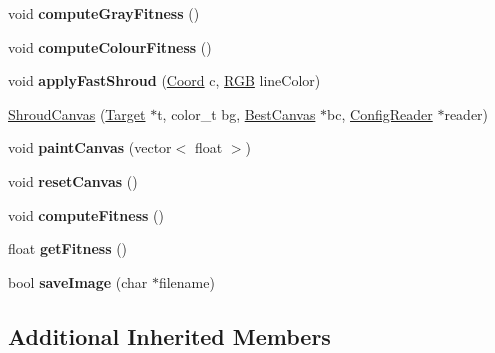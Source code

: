 \begin{DoxyCompactItemize}
\item 
\hypertarget{class_shroud_canvas_aafb22920622d9c722b46d89ac3763cd1}{void {\bfseries compute\-Gray\-Fitness} ()}\label{class_shroud_canvas_aafb22920622d9c722b46d89ac3763cd1}

\item 
\hypertarget{class_shroud_canvas_a4a52d39ad5baa0af0f75265e0c0199fe}{void {\bfseries compute\-Colour\-Fitness} ()}\label{class_shroud_canvas_a4a52d39ad5baa0af0f75265e0c0199fe}

\item 
\hypertarget{class_shroud_canvas_a91e19afb81445e373c0f66983d7d7bae}{void {\bfseries apply\-Fast\-Shroud} (\hyperlink{struct_coord}{Coord} c, \hyperlink{struct_r_g_b}{R\-G\-B} line\-Color)}\label{class_shroud_canvas_a91e19afb81445e373c0f66983d7d7bae}

\item 
\hyperlink{class_shroud_canvas_af61ed840d4483e18098eaadae9240282}{Shroud\-Canvas} (\hyperlink{class_target}{Target} $\ast$t, color\-\_\-t bg, \hyperlink{class_best_canvas}{Best\-Canvas} $\ast$bc, \hyperlink{class_config_reader}{Config\-Reader} $\ast$reader)
\item 
\hypertarget{class_shroud_canvas_ab0962bd430ae1fdc9e61b487e45a4fa1}{void {\bfseries paint\-Canvas} (vector$<$ float $>$)}\label{class_shroud_canvas_ab0962bd430ae1fdc9e61b487e45a4fa1}

\item 
\hypertarget{class_shroud_canvas_af90fc7e9d58b8089ffb5ba8ece8c15df}{void {\bfseries reset\-Canvas} ()}\label{class_shroud_canvas_af90fc7e9d58b8089ffb5ba8ece8c15df}

\item 
\hypertarget{class_shroud_canvas_aed1b210f02c2735df7459a992cdeb208}{void {\bfseries compute\-Fitness} ()}\label{class_shroud_canvas_aed1b210f02c2735df7459a992cdeb208}

\item 
\hypertarget{class_shroud_canvas_abf7c734ddad8bbf2f2478f27eac50c31}{float {\bfseries get\-Fitness} ()}\label{class_shroud_canvas_abf7c734ddad8bbf2f2478f27eac50c31}

\item 
\hypertarget{class_shroud_canvas_acc333c5db435c480b62f7f9e5d1acbd0}{bool {\bfseries save\-Image} (char $\ast$filename)}\label{class_shroud_canvas_acc333c5db435c480b62f7f9e5d1acbd0}

\end{DoxyCompactItemize}
\subsection*{Additional Inherited Members}


